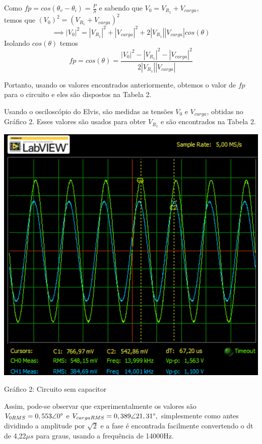 \documentclass[a4 paper]{article}
\begin{document}
Como $fp=cos(\theta_v-\theta_i)=\frac{P}{S}$ e sabendo que $V_0=V_{R_1}+V_{carga}$, \\temos que $(V_0)^2=(V_{R_1}+V_{carga})^2$
\[\implies|V_0|^2=|V_{R_1}|^2 + |V_{carga}|^2+2|V_{R_1}||V_{carga}|cos(\theta)\]
Isolando $cos(\theta)$ temos 
\[fp = cos(\theta)= \frac{|V_0|^2-|V_{R_1}|^2-|V_{carga}|^2}{2|V_{R_1}||V_{carga}|}\]

Portanto, usando os valores encontrados anteriormente, obtemos o valor de $fp$ para o circuito e eles são dispostos na Tabela 2.

Usando o osciloscópio do Elvis, são medidas as tensões $V_0$ e $V_{carga}$, obtidas no Gráfico 2. Esses valores são usados para obter $V_{R_1}$ e são encontrados na Tabela 2. 

\newpage

\begin{table}[h]
\centering
\includegraphics[scale=0.3575]{rgadicoas/rgadicoa1}
\end{table}

\begin{center}
Gráfico 2: Circuito sem capacitor
\end{center}

Assim, pode-se observar que experimentalmente os valores são $V_{0RMS}=0,553\angle0\text{\textdegree}$ e $V_{cargaRMS}=0,389\angle21,31\text{\textdegree},$ simplesmente como antes dividindo a amplitude por $\sqrt{2}$ e a fase é encontrada facilmente convertendo o dt de 4,22$\mu s$ para graus, usando a frequência de 14000Hz.
\end{document}
